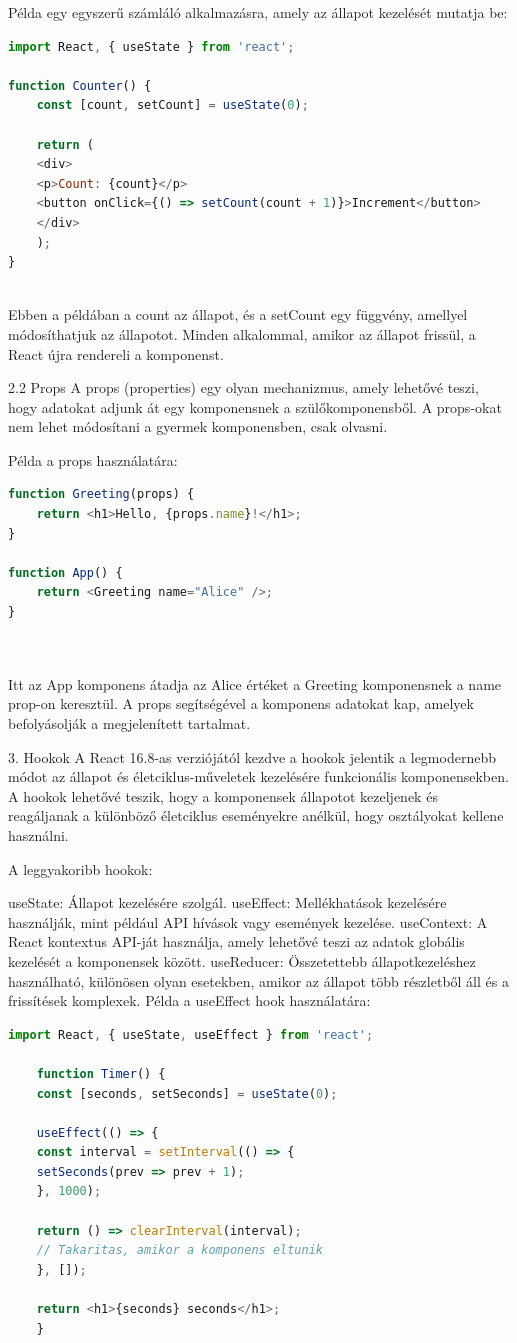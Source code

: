 \documentclass[colorlinks]{thesis-kando}
\theoremstyle{definition}
\theoremstyle{remark}
\begin{document}
Példa egy egyszerű számláló alkalmazásra, amely az állapot kezelését mutatja be:
\begin{lstlisting}[language=JavaScript]
import React, { useState } from 'react';

function Counter() {
	const [count, setCount] = useState(0);
	
	return (
	<div>
	<p>Count: {count}</p>
	<button onClick={() => setCount(count + 1)}>Increment</button>
	</div>
	);
}
	

\end{lstlisting}


Ebben a példában a count az állapot, és a setCount egy függvény, amellyel módosíthatjuk az állapotot. Minden alkalommal, amikor az állapot frissül, a React újra rendereli a komponenst.

2.2 Props
A props (properties) egy olyan mechanizmus, amely lehetővé teszi, hogy adatokat adjunk át egy komponensnek a szülőkomponensből. A props-okat nem lehet módosítani a gyermek komponensben, csak olvasni.

Példa a props használatára:
\begin{lstlisting}[language=JavaScript]
function Greeting(props) {
	return <h1>Hello, {props.name}!</h1>;
}

function App() {
	return <Greeting name="Alice" />;
}

	
\end{lstlisting}


Itt az App komponens átadja az Alice értéket a Greeting komponensnek a name prop-on keresztül. A props segítségével a komponens adatokat kap, amelyek befolyásolják a megjelenített tartalmat.

3. Hookok
A React 16.8-as verziójától kezdve a hookok jelentik a legmodernebb módot az állapot és életciklus-műveletek kezelésére funkcionális komponensekben. A hookok lehetővé teszik, hogy a komponensek állapotot kezeljenek és reagáljanak a különböző életciklus eseményekre anélkül, hogy osztályokat kellene használni.

A leggyakoribb hookok:

useState: Állapot kezelésére szolgál.
useEffect: Mellékhatások kezelésére használják, mint például API hívások vagy események kezelése.
useContext: A React kontextus API-ját használja, amely lehetővé teszi az adatok globális kezelését a komponensek között.
useReducer: Összetettebb állapotkezeléshez használható, különösen olyan esetekben, amikor az állapot több részletből áll és a frissítések komplexek.
Példa a useEffect hook használatára:
\begin{lstlisting}[language=JavaScript]
	import React, { useState, useEffect } from 'react';
	
	function Timer() {
	const [seconds, setSeconds] = useState(0);
		
	useEffect(() => {
	const interval = setInterval(() => {
	setSeconds(prev => prev + 1);
	}, 1000);
			
	return () => clearInterval(interval); 
	// Takaritas, amikor a komponens eltunik
	}, []);
		
	return <h1>{seconds} seconds</h1>;
	}
\end{lstlisting}
\end{document}
